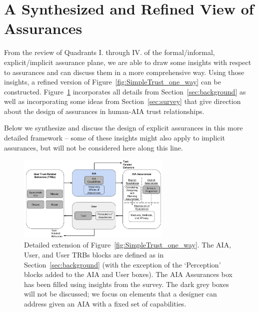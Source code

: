\section{A Synthesized and Refined View of Assurances} \label{sec:synthesis}
    From the review of Quadrants I. through IV. of the formal/informal, explicit/implicit assurance plane, we are able to draw some insights with respect to assurances and can discuss them in a more comprehensive way. Using those insights, a refined version of Figure~\ref{fig:SimpleTrust_one_way} can be constructed. Figure~\ref{fig:refined_assurances} incorporates all details from Section~\ref{sec:background} as well as incorporating some ideas from Section~\ref{sec:survey} that give direction about the design of assurances in human-AIA trust relationships. 
   
   Below we synthesize and discuss the design of explicit assurances in this more detailed framework -- some of these insights might also apply to implicit assurances, but will not be considered here along this line. %

    \begin{figure}[htbp]
        \centering
        \includegraphics[width=0.65\textwidth]{Figures/RefinedTrust_one_way}
        \caption{Detailed extension of Figure~\ref{fig:SimpleTrust_one_way}. The AIA, User, and User TRBs blocks are defined as in Section~\ref{sec:background} (with the exception of the `Perception' blocks added to the AIA and User boxes). The AIA Assurances box has been filled using insights from the survey. The dark grey boxes will not be discussed; we focus on elements that a designer can address given an AIA with a fixed set of capabilities.}
        \label{fig:refined_assurances}
    \end{figure}

